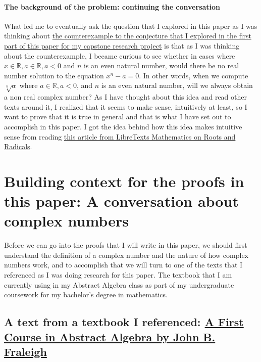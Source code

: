 \documentclass{article}
\begin{document}
\paragraph{The background of the problem: continuing the conversation} 

What led me to eventually ask the question that I explored in this paper as I was thinking about \hyperlink{counterexample from paper 1}{the counterexample to the conjecture  that I explored in the first part of this paper for my capstone research project} is that as I was thinking about the counterexample, I became curious to see whether in cases where \(x \in \mathds{R}, a \in \mathds{R}, a < 0\) and \(n\) is an even natural number, would there be no real number solution to the equation \(x^n - a = 0\). In other words, when we compute \(\sqrt[n]{a}\) where \(a \in \mathds{R}, a < 0\), and \(n\) is an even natural number, will we always obtain a non real complex number? As I have thought about this idea and read other texts around it, I realized that it seems to make sense, intuitively at least, so I want to prove that it is true in general and that is what I have set out to accomplish in this paper. I got the idea behind how this idea makes intuitive sense from reading \href{https://math.libretexts.org/Bookshelves/Algebra/Advanced_Algebra/05%3A_Radical_Functions_and_Equations/5.01%3A_Roots_and_Radicals}{this article from LibreTexts Mathematics on Roots and Radicals}. 

\section{Building context for the proofs in this paper: A conversation about complex numbers}
Before we can go into the proofs that I will write in this paper, we should first understand the definition of a complex number and the nature of how complex numbers work, and to accomplish that we will turn to one of the texts that I referenced as I was doing research for this paper. The textbook that I am currently using in my Abstract Algebra class as part of my undergraduate coursework for my bachelor's degree in mathematics.  

\subsection{A text from a textbook I referenced: \href{https://www.amazon.com/First-Course-Abstract-Algebra-7th/dp/0201763907/ref=tmm_hrd_swatch_0?_encoding=UTF8&qid=&sr=}{A First Course in Abstract Algebra by John B. Fraleigh}}  
\end{document}
